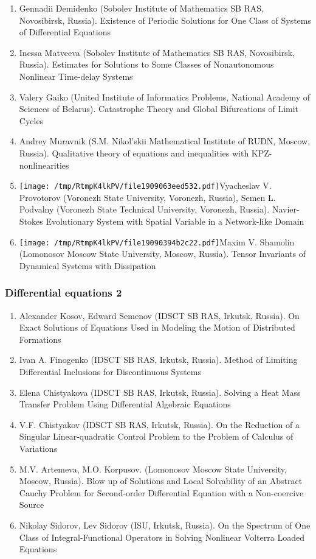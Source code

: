 \documentclass[
]{article}
\providecommand{\tightlist}{%
  \setlength{\itemsep}{0pt}\setlength{\parskip}{0pt}}
\begin{document}
\begin{enumerate}
\def\labelenumi{\arabic{enumi}.}
\tightlist
\item
  Gennadii Demidenko (Sobolev Institute of Mathematics SB RAS,
  Novosibirsk, Russia). Existence of Periodic Solutions for One Class of
  Systems of Differential Equations
\item
  Inessa Matveeva (Sobolev Institute of Mathematics SB RAS, Novosibirsk,
  Russia). Estimates for Solutions to Some Classes of Nonautonomous
  Nonlinear Time-delay Systems
\item
  Valery Gaiko (United Institute of Informatics Problems, National
  Academy of Sciences of Belarus). Catastrophe Theory and Global
  Bifurcations of Limit Cycles
\item
  Andrey Muravnik (S.M. Nikol'skii Mathematical Institute of RUDN,
  Moscow, Russia). Qualitative theory of equations and inequalities with
  KPZ-nonlinearities
\item
  \protect\texttt{[image: /tmp/RtmpK4lkPV/file1909063eed532.pdf]}Vyacheslav
  V. Provotorov (Voronezh State University, Voronezh, Russia), Semen L.
  Podvalny (Voronezh State Technical University, Voronezh, Russia).
  Navier-Stokes Evolutionary System with Spatial Variable in a
  Network-like Domain
\item
  \protect\texttt{[image: /tmp/RtmpK4lkPV/file19090394b2c22.pdf]}Maxim
  V. Shamolin (Lomonosov Moscow State University, Moscow, Russia).
  Tensor Invariants of Dynamical Systems with Dissipation
\end{enumerate}

\hypertarget{de2}{%
\subsubsection{Differential equations 2}\label{de2}}

\begin{enumerate}
\def\labelenumi{\arabic{enumi}.}
\tightlist
\item
  Alexander Kosov, Edward Semenov (IDSCT SB RAS, Irkutsk, Russia). On
  Exact Solutions of Equations Used in Modeling the Motion of
  Distributed Formations
\item
  Ivan A. Finogenko (IDSCT SB RAS, Irkutsk, Russia). Method of Limiting
  Differential Inclusions for Discontinuous Systems
\item
  Elena Chistyakova (IDSCT SB RAS, Irkutsk, Russia). Solving a Heat Mass
  Transfer Problem Using Differential Algebraic Equations
\item
  V.F. Chistyakov (IDSCT SB RAS, Irkutsk, Russia). On the Reduction of a
  Singular Linear-quadratic Control Problem to the Problem of Calculus
  of Variations
\item
  M.V. Artemeva, M.O. Korpusov. (Lomonosov Moscow State University,
  Moscow, Russia). Blow up of Solutions and Local Solvability of an
  Abstract Cauchy Problem for Second-order Differential Equation with a
  Non-coercive Source
\item
  Nikolay Sidorov, Lev Sidorov (ISU, Irkutsk, Russia). On the Spectrum
  of One Class of Integral-Functional Operators in Solving Nonlinear
  Volterra Loaded Equations
\end{enumerate}
\end{document}
